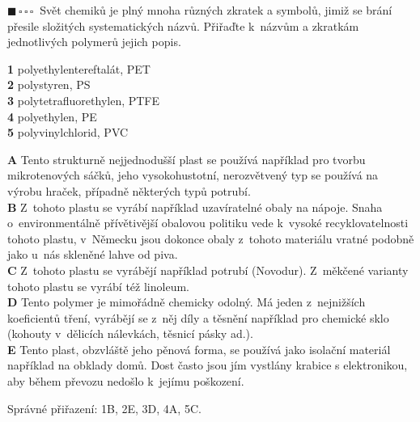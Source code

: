\documentclass{book}
\newcommand{\jeden}{$\blacksquare \, \square \, \square \, \square \; \; $}
\renewenvironment{quotation}{\par}{\par} %
\begin{document}
\begin{quotation}
\jeden Svět chemiků je plný mnoha různých zkratek a symbolů, jimiž se brání
přesile složitých systematických názvů. Přiřaďte k~názvům a zkratkám
jednotlivých polymerů jejich popis.

\noindent\textbf{1} polyethylentereftalát, PET\\
\textbf{2} polystyren, PS\\
\textbf{3} polytetrafluorethylen, PTFE\\
\textbf{4} polyethylen, PE\\
\textbf{5} polyvinylchlorid, PVC\par
\vspace{3mm}
\noindent\textbf{A} Tento strukturně nejjednodušší plast se používá například pro tvorbu
mikrotenových sáčků, jeho vysokohustotní, nerozvětvený typ se používá
na výrobu hraček, případně některých typů potrubí.\\
\textbf{B} Z~tohoto plastu se vyrábí například uzavíratelné obaly na nápoje.
Snaha o~environmentálně přívětivější obalovou politiku vede k~vysoké
recyklovatelnosti tohoto plastu, v~Německu jsou dokonce obaly z~tohoto
materiálu vratné podobně jako u~nás skleněné lahve od piva.\\
\textbf{C} Z~tohoto plastu se vyrábějí například potrubí (Novodur). Z~měkčené
varianty tohoto plastu se vyrábí též linoleum.\\
\textbf{D} Tento polymer je mimořádně chemicky odolný. Má jeden z~nejnižších
koeficientů tření, vyrábějí se z~něj díly a těsnění například pro
chemické sklo (kohouty v~dělicích nálevkách, těsnicí pásky ad.).\\
\textbf{E} Tento plast, obzvláště jeho pěnová forma, se používá jako isolační
materiál například na obklady domů. Dost často jsou jím vystlány krabice
s elektronikou, aby během převozu nedošlo k~jejímu poškození.
\end{quotation} \dotfill \par 
Správné přiřazení: 1B, 2E, 3D, 4A, 5C.
\end{document}
